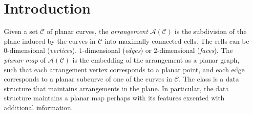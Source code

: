 \section*{Introduction}
\label{arr_ref_sec:intro}
Given a set $\mathcal{C}$ of planar curves, the {\em arrangement}
${\mathcal A}({\mathcal C})$ is the subdivision of the plane induced
by the curves in $\mathcal{C}$ into maximally connected cells. The cells
can be $0$-dimensional ({\em vertices}), $1$-dimensional ({\em edges})
or $2$-dimensional ({\em faces}). The {\em planar map} of ${\mathcal
A}({\mathcal C})$ is the embedding of the arrangement as a planar
graph, such that each arrangement vertex corresponds to a planar
point, and each edge corresponds to a planar subcurve of one of the
curves in ${\mathcal C}$.
The class  is a data structure that maintains
arrangements in the plane. In particular, the data structure maintains a
planar map perhaps with its features exsented with additional information.

